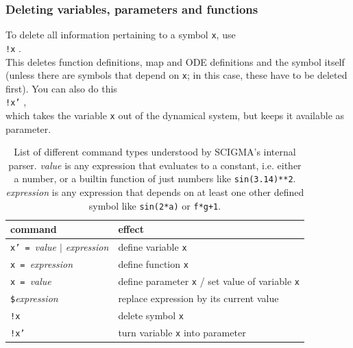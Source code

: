 \documentclass[10pt,a4paper,titlepage]{article}
\newcommand{\T}[1]{\texttt{#1}}
\begin{document}
\subsubsection*{Deleting variables, parameters and functions}
To delete all information pertaining to a symbol \T{x}, use\\
\T{!x} .\\
This deletes function definitions, map and ODE definitions and the symbol itself (unless there are symbols that depend on \T{x}; in this case, these have to be deleted first).
You can also do this\\
\T{!x'} ,\\ 
which takes the variable \T{x} out of the dynamical system, but keeps it available as parameter.
\begin{table}
\centering
\begin{tabular}{ll}
\textbf{command}&\textbf{effect}\\\hline
\T{x' = }\emph{value $\vert$ expression}&define variable \T{x}\\
\T{x = }\emph{expression}&define function \T{x}\\
\T{x = }\emph{value}&define parameter \T{x} / set value of variable \T{x}\\
\T{\$}\emph{expression}&replace expression by its current value\\
\T{!x}&delete symbol \T{x}\\
\T{!x'}&turn variable \T{x} into parameter \\
\end{tabular}
\caption{List of different command types understood by SCIGMA's internal parser. \emph{value} is any expression that evaluates to a constant, i.e. either a number, or a builtin function of just numbers like \T{sin(3.14)**2}.
\emph{expression} is any expression that depends on at least one other defined symbol like \T{sin(2*a)} or \T{f*g+1}.}
\label{comm}
\end{table}
\end{document}
